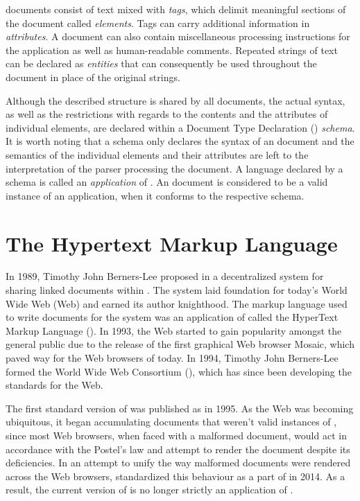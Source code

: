 \documentclass[b5paper]{book}
\begin{document}
         documents consist of text mixed with \emph{tags}, which
        delimit meaningful sections of the document called \emph{elements}.
        Tags can carry additional information in \emph{attributes}. A
         document can also contain miscellaneous processing
        instructions for the application as well as human-readable comments.
        Repeated strings of text can be declared as \emph{entities} that can
        consequently be used throughout the document in place of the original
        strings.
        
        Although the described structure is shared by all 
        documents, the actual syntax, as well as the restrictions with regards
        to the contents and the attributes of individual elements, are declared
        within a Document Type Declaration () \emph{schema}. It is
        worth noting that a  schema only declares the syntax of an
         document and the semantics of the individual elements and
        their attributes are left to the interpretation of the parser processing
        the document. A language declared by a  schema is called an
        \emph{application} of . An  document is
        considered to be a valid instance of an  application, when
        it conforms to the respective  schema.

      \section{The Hypertext Markup Language}
        In 1989, Timothy John Berners-Lee proposed in \cite{bernerslee89} a
        decentralized system for sharing linked documents within .
        The system laid foundation for today's World Wide Web (Web) and earned
        its author knighthood. The markup language used to write documents for
        the system was an application of  called the HyperText
        Markup Language (). In 1993, the Web started to gain
        popularity amongst the general public due to the release of the first
        graphical Web browser Mosaic, which paved way for the Web browsers of
        today. In 1994, Timothy John Berners-Lee formed the World Wide Web
        Consortium (), which has since been developing the
        standards for the Web.
        
        The first standard version of  was published as
        \cite{rfc1866} in 1995. As the Web was becoming ubiquitous, it began
        accumulating documents that weren't valid instances of ,
        since most Web browsers, when faced with a malformed document, would act
        in accordance with the Postel's law and attempt to render the document
        despite its deficiencies. In an attempt to unify the way malformed
         documents were rendered across the Web browsers,
         standardized this behaviour as a part of \cite{berjon14}
        in 2014. As a result, the current version of  is no longer
        strictly an application of .
\end{document}
